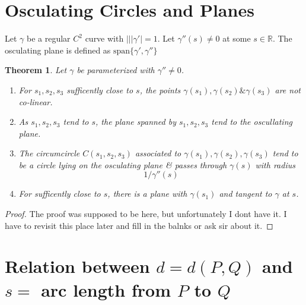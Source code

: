 \documentclass[oneside]{book}\twocolumn
\newtheorem{theorem}{Theorem}
\begin{document}
\section{Osculating Circles and Planes}
Let $\gamma$ be a regular $C^2$ curve with $|||\gamma'|=1$. Let $\gamma''(s)\ne 0$ at some $s\in\mathbb R$. The osculating plane is defined as $\text{span}\{\gamma',\gamma''\}$
\begin{theorem}
    Let $\gamma$ be parameterized with $\gamma''\ne0$. 
    \begin{enumerate}
        \item For $s_1,s_2,s_3$ sufficently close to $s$, the points $\gamma(s_1),\gamma(s_2)\&\gamma(s_3)$ are not co-linear.
        \item As $s_1,s_2,s_3$ tend to $s$, the plane spanned by $s_1,s_2,s_3$ tend to the oscullating plane. 
        \item The circumcircle $C(s_1,s_2,s_3)$ associated to $\gamma(s_1),\gamma(s_2),\gamma(s_3)$ tend to be a circle lying on the osculating plane \& passes through $\gamma(s)$ with radius $$1/\gamma''(s)$$
        \item For sufficently close to $s$, there is a plane with $\gamma(s_1)$ and tangent to $\gamma$ at $s$.
    \end{enumerate}
\end{theorem}
\begin{proof}
    The proof was supposed to be here, but unfortunately I dont have it. I have to revisit this place later and fill in the balnks or ask sir about it.
\end{proof}
\section{Relation between $d=d(P,Q)$ and $s= $ arc length from $P$ to $Q$}
\end{document}
